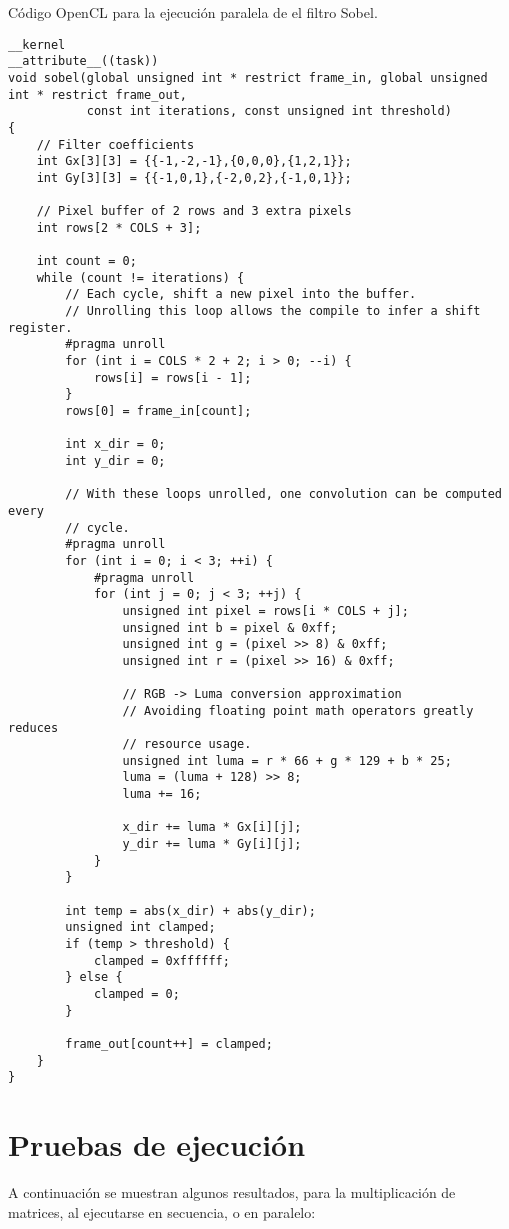 \documentclass[12pt,a4paper]{article}
\begin{document}
Código OpenCL para la ejecución paralela de el filtro Sobel.
\begin{lstlisting}
__kernel
__attribute__((task))
void sobel(global unsigned int * restrict frame_in, global unsigned int * restrict frame_out,
           const int iterations, const unsigned int threshold)
{
    // Filter coefficients
    int Gx[3][3] = {{-1,-2,-1},{0,0,0},{1,2,1}};
    int Gy[3][3] = {{-1,0,1},{-2,0,2},{-1,0,1}};

    // Pixel buffer of 2 rows and 3 extra pixels
    int rows[2 * COLS + 3];

    int count = 0;
    while (count != iterations) {
        // Each cycle, shift a new pixel into the buffer.
        // Unrolling this loop allows the compile to infer a shift register.
        #pragma unroll
        for (int i = COLS * 2 + 2; i > 0; --i) {
            rows[i] = rows[i - 1];
        }
        rows[0] = frame_in[count];

        int x_dir = 0;
        int y_dir = 0;

        // With these loops unrolled, one convolution can be computed every
        // cycle.
        #pragma unroll
        for (int i = 0; i < 3; ++i) {
            #pragma unroll
            for (int j = 0; j < 3; ++j) {
                unsigned int pixel = rows[i * COLS + j];
                unsigned int b = pixel & 0xff;
                unsigned int g = (pixel >> 8) & 0xff;
                unsigned int r = (pixel >> 16) & 0xff;

                // RGB -> Luma conversion approximation
                // Avoiding floating point math operators greatly reduces
                // resource usage.
                unsigned int luma = r * 66 + g * 129 + b * 25;
                luma = (luma + 128) >> 8;
                luma += 16;

                x_dir += luma * Gx[i][j];
                y_dir += luma * Gy[i][j];
            }
        }

        int temp = abs(x_dir) + abs(y_dir);
        unsigned int clamped;
        if (temp > threshold) {
            clamped = 0xffffff;
        } else {
            clamped = 0;
        }

        frame_out[count++] = clamped;
    }
}
\end{lstlisting}
\section{Pruebas de ejecución}
A continuación se muestran algunos resultados, para la multiplicación de matrices, al ejecutarse en secuencia, o en
paralelo:
\end{document}
